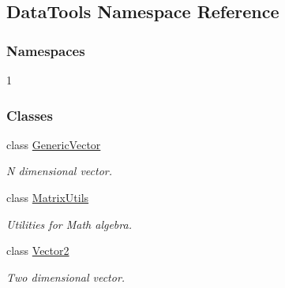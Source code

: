 \hypertarget{namespaceDataTools}{}\subsection{Data\+Tools Namespace Reference}
\label{namespaceDataTools}
\subsubsection*{Namespaces}
\begin{DoxyCompactItemize}
\item 1
\end{DoxyCompactItemize}
\subsubsection*{Classes}
\begin{DoxyCompactItemize}
\item 
class \hyperlink{classDataTools_1_1GenericVector}{Generic\+Vector}
\begin{DoxyCompactList}\small\item\em N dimensional vector. \end{DoxyCompactList}\item 
class \hyperlink{classDataTools_1_1MatrixUtils}{Matrix\+Utils}
\begin{DoxyCompactList}\small\item\em Utilities for Math algebra. \end{DoxyCompactList}\item 
class \hyperlink{classDataTools_1_1Vector2}{Vector2}
\begin{DoxyCompactList}\small\item\em Two dimensional vector. \end{DoxyCompactList}\end{DoxyCompactItemize}
